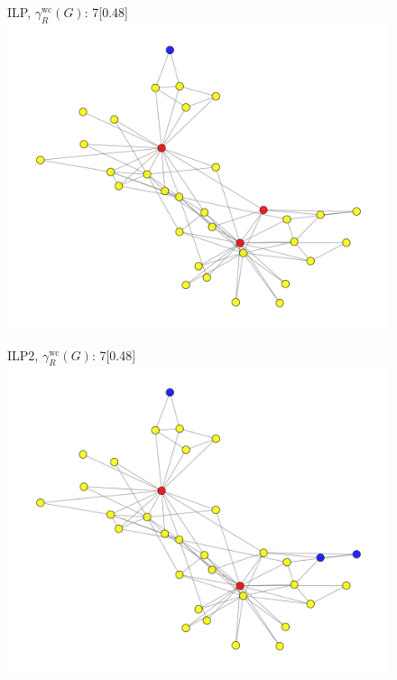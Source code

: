 \begin{figure}[H]
    \centering
    \begin{subcaptionbox}{ILP, $\gamma^{\text{wc}}_R(G)$: 7\label{fig:ilp}}[0.48\linewidth]
        {\includegraphics[width=\linewidth]{assets/Facebook/ilp.png}}
    \end{subcaptionbox}
    \hfill
    \begin{subcaptionbox}{ILP2,  $\gamma^{\text{wc}}_R(G)$: 7\label{fig:ilp2}}[0.48\linewidth]
        {\includegraphics[width=\linewidth]{assets/Facebook/ilp2.png}}
    \end{subcaptionbox}
    \hfill

\end{figure}
